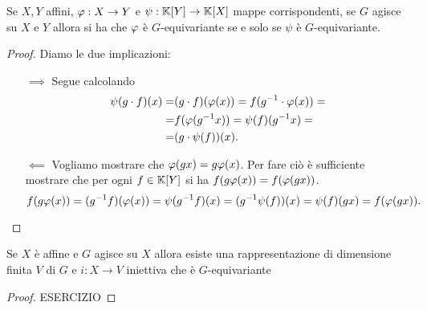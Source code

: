 \begin{proposition}\label{PrMappaTraAffiniGequivarianteSSeMappaTraAlgebreGEquivariante}
Se $X,Y$ affini, $\varphi:X\to Y$ e $\psi:\mathbb{K}[Y]\to \mathbb{K}[X]$ mappe corrispondenti, se $G$ agisce su $X$ e $Y$ allora si ha che $\varphi$ \`e $G$-equivariante se e solo se $\psi$ \`e $G$-equivariante.
\end{proposition}
\begin{proof}
Diamo le due implicazioni:
\setlength{\leftmargini}{0cm}
\begin{itemize}
\item[$\boxed{\implies}$] Segue calcolando
\begin{align*}
\psi(g\cdot f)(x)=& (g\cdot f)(\varphi(x))= f(g^{-1}\cdot \varphi(x))=\\
=&f(\varphi(g^{-1} x))=\psi(f)(g^{-1} x)=\\
=&(g\cdot \psi(f))(x).
\end{align*}
\item[$\boxed{\impliedby}$] Vogliamo mostrare che $\varphi(gx)=g\varphi(x)$. Per fare ci\`o \`e sufficiente mostrare che per ogni $f\in\mathbb{K}[Y]$ si ha $f(g\varphi(x))=f(\varphi(gx))$.
\[f(g\varphi(x))=(g^{-1} f)(\varphi(x))=\psi(g^{-1} f)(x)=(g^{-1}\psi(f))(x)=\psi(f)(gx)=f(\varphi(gx)).\]
\end{itemize}
\setlength{\leftmargini}{0.5cm}
\end{proof}


\begin{theorem}
Se $X$ \`e affine e $G$ agisce su $X$ allora esiste una rappresentazione di dimensione finita $V$ di $G$ e $i:X\to V$ iniettiva che \`e $G$-equivariante
\end{theorem}
\begin{proof}
ESERCIZIO
\end{proof}

